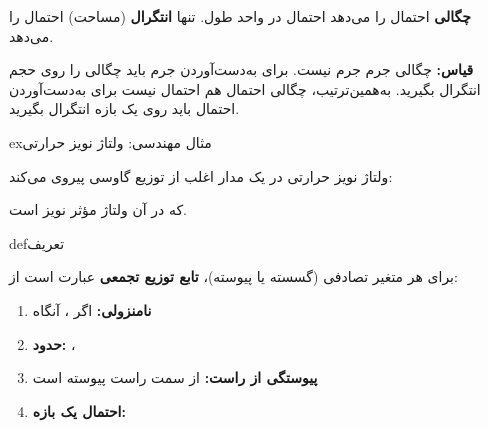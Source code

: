  \textbf{چگالی} احتمال را می‌دهد  احتمال در واحد طول. تنها \textbf{انتگرال} (مساحت) احتمال را می‌دهد.

\textbf{قیاس:} چگالی جرم  جرم نیست. برای به‌دست‌آوردن جرم باید چگالی را روی حجم انتگرال بگیرید. به‌همین‌ترتیب، چگالی احتمال هم احتمال نیست  برای به‌دست‌آوردن احتمال باید روی یک بازه انتگرال بگیرید.



\begin{PSbox}[unbreakable]{ex}{مثال مهندسی: ولتاژ نویز حرارتی}

ولتاژ نویز حرارتی در یک مدار اغلب از توزیع گاوسی پیروی می‌کند:


که در آن \lr{$\sigma$} ولتاژ مؤثر  نویز است.


\end{PSbox}


\begin{PSbox}[unbreakable]{def}{تعریف}

برای هر متغیر تصادفی  (گسسته یا پیوسته)، \textbf{تابع توزیع تجمعی} عبارت است از:


\end{PSbox}


\begin{enumerate}
\def\labelenumi{\arabic{enumi}.}
\tightlist
\item
  \textbf{نامنزولی:} اگر ، آنگاه 
\item
  \textbf{حدود:} ، 
\item
  \textbf{پیوستگی از راست:}  از سمت راست پیوسته است
\item
  \textbf{احتمال یک بازه:} 
\end{enumerate}


